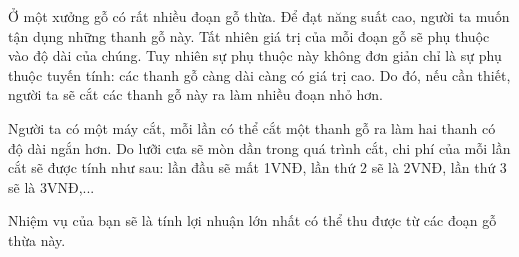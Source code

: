 Ở một xưởng gỗ có rất nhiều đoạn gỗ thừa. Để đạt năng suất cao, người ta muốn tận dụng những thanh gỗ này. Tất nhiên giá trị của mỗi đoạn gỗ sẽ phụ thuộc vào độ dài của chúng. Tuy nhiên sự phụ thuộc này không đơn giản chỉ là sự phụ thuộc tuyến tính: các thanh gỗ càng dài càng có giá trị cao. Do đó, nếu cần thiết, người ta sẽ cắt các thanh gỗ này ra làm nhiều đoạn nhỏ hơn.  

   Người ta có một máy cắt, mỗi lần có thể cắt một thanh gỗ ra làm hai thanh có độ dài ngắn hơn. Do lưỡi cưa sẽ mòn dần trong quá trình cắt, chi phí của mỗi lần cắt sẽ được tính như sau: lần đầu sẽ mất 1VNĐ, lần thứ 2 sẽ là 2VNĐ, lần thứ 3 sẽ là 3VNĐ,...  

   Nhiệm vụ của bạn sẽ là tính lợi nhuận lớn nhất có thể thu được từ các đoạn gỗ thừa này.